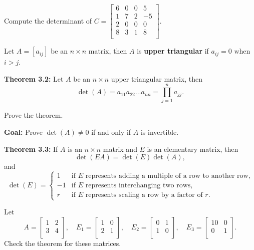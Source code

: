 \documentclass[12pt,letterpaper]{article}
\begin{document}
\begin{enumerate}

\Problem Compute the determinant of 
$C=\begin{bmatrix}
6 & 0 & 0 & 5\\
1 & 7 & 2 & -5\\
2 & 0 & 0 & 0\\
8 & 3 & 1 & 8\\
\end{bmatrix}$.

\vfill

\begin{defn} Let $A=[a_{ij}]$ be an $n\times n$ matrix, then $A$ is {\bf upper triangular} if $a_{ij}=0$ when $i>j$.
\end{defn}

{\bf Theorem 3.2:} Let $A$ be an $n\times n$ upper triangular matrix, then $$\operatorname{det}(A)= a_{11}a_{22}\dots a_{nn} = \prod_{j=1}^n a_{jj}.$$

\Problem Prove the theorem.

\vfill
\vfill


\newpage

{\bf Goal:} Prove $\operatorname{det}(A)\neq 0$ if and only if $A$ is invertible.

{\bf Theorem 3.3:} If $A$ is an $n\times n$ matrix and $E$ is an elementary matrix, then $$\operatorname{det}(EA)=\operatorname{det}(E) \operatorname{det}(A),$$ and 
$$\operatorname{det}(E)=\begin{cases}
1 & \text{if $E$ represents adding a multiple of a row to another row,}\\
-1 & \text{if $E$ represents interchanging two rows,}\\
r & \text{if $E$ represents scaling a row by a factor of $r$.}
\end{cases}$$

\Problem Let $$A=\begin{bmatrix} 1 & 2\\ 3 & 4\\ \end{bmatrix}, \quad E_1=\begin{bmatrix} 1 & 0\\ 2 & 1\\ \end{bmatrix}, \quad E_2=\begin{bmatrix} 0 & 1\\ 1 & 0\\ \end{bmatrix}, \quad E_3=\begin{bmatrix} 10 & 0\\ 0 & 1\\ \end{bmatrix}.$$ Check the theorem for these matrices.


\end{enumerate}
\end{document}
